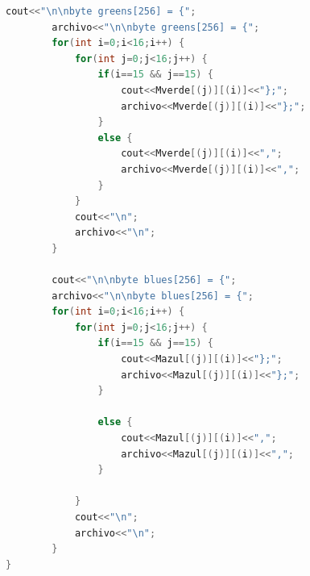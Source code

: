 \documentclass{article}
\begin{document}
\begin{lstlisting}[language=C++, label=codigo_ejemplo]
        cout<<"\n\nbyte greens[256] = {";
        archivo<<"\n\nbyte greens[256] = {";
        for(int i=0;i<16;i++) {
            for(int j=0;j<16;j++) {
                if(i==15 && j==15) {
                    cout<<Mverde[(j)][(i)]<<"};";
                    archivo<<Mverde[(j)][(i)]<<"};";
                }
                else {
                    cout<<Mverde[(j)][(i)]<<",";
                    archivo<<Mverde[(j)][(i)]<<",";
                }
            }
            cout<<"\n";
            archivo<<"\n";
        }

        cout<<"\n\nbyte blues[256] = {";
        archivo<<"\n\nbyte blues[256] = {";
        for(int i=0;i<16;i++) {
            for(int j=0;j<16;j++) {
                if(i==15 && j==15) {
                    cout<<Mazul[(j)][(i)]<<"};";
                    archivo<<Mazul[(j)][(i)]<<"};";
                }

                else {
                    cout<<Mazul[(j)][(i)]<<",";
                    archivo<<Mazul[(j)][(i)]<<",";
                }

            }
            cout<<"\n";
            archivo<<"\n";
        }
}
    
    \end{lstlisting}
\end{document}

